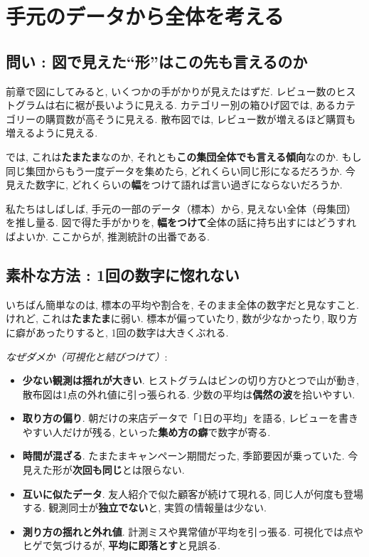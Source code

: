 \section{手元のデータから全体を考える}

  \subsection{問い : 図で見えた“形”はこの先も言えるのか}
    前章で図にしてみると, いくつかの手がかりが見えたはずだ.  
    レビュー数のヒストグラムは右に裾が長いように見える.  
    カテゴリー別の箱ひげ図では, あるカテゴリーの購買数が高そうに見える.  
    散布図では, レビュー数が増えるほど購買も増えるように見える.

    では, これは\textbf{たまたま}なのか, それとも\textbf{この集団全体でも言える傾向}なのか.  
    もし同じ集団からもう一度データを集めたら, どれくらい同じ形になるだろうか.  
    今見えた数字に, どれくらいの\textbf{幅}をつけて語れば言い過ぎにならないだろうか.

    私たちはしばしば, 手元の一部のデータ（標本）から, 見えない全体（母集団）を推し量る.  
    図で得た手がかりを, \textbf{幅をつけて}全体の話に持ち出すにはどうすればよいか.  
    ここからが, 推測統計の出番である.

  \subsection{素朴な方法 : 1回の数字に惚れない}
    いちばん簡単なのは, 標本の平均や割合を, そのまま全体の数字だと見なすこと.  
    けれど, これは\textbf{たまたま}に弱い. 標本が偏っていたり, 数が少なかったり, 取り方に癖があったりすると, 1回の数字は大きくぶれる.

    \textit{なぜダメか（可視化と結びつけて）}:
    \begin{itemize}
      \item \textbf{少ない観測は揺れが大きい}. ヒストグラムはビンの切り方ひとつで山が動き, 散布図は1点の外れ値に引っ張られる. 少数の平均は\textbf{偶然の波}を拾いやすい.
      \item \textbf{取り方の偏り}. 朝だけの来店データで「1日の平均」を語る, レビューを書きやすい人だけが残る, といった\textbf{集め方の癖}で数字が寄る.
      \item \textbf{時間が混ざる}. たまたまキャンペーン期間だった, 季節要因が乗っていた. 今見えた形が\textbf{次回も同じ}とは限らない.
      \item \textbf{互いに似たデータ}. 友人紹介で似た顧客が続けて現れる, 同じ人が何度も登場する. 観測同士が\textbf{独立でない}と, 実質の情報量は少ない.
      \item \textbf{測り方の揺れと外れ値}. 計測ミスや異常値が平均を引っ張る. 可視化では点やヒゲで気づけるが, \textbf{平均に即落とす}と見誤る.
    \end{itemize}


